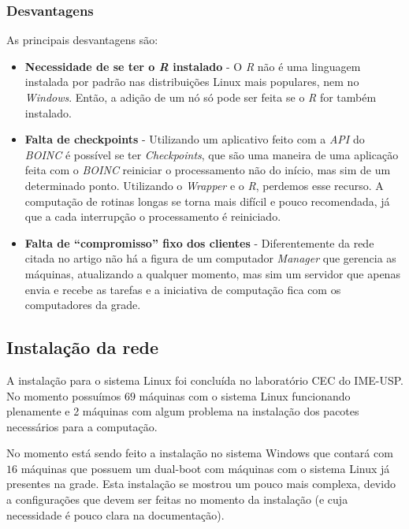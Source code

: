 \subsubsection{Desvantagens}

As principais desvantagens são:

\begin{itemize}
  \item \textbf{Necessidade de se ter o \emph{R} instalado} - O \emph{R} não é uma linguagem ins\-ta\-la\-da por padrão
nas distribuições Linux mais populares, nem no \emph{Windows}. Então, a adição de um nó só pode ser feita se o \emph{R}
for também instalado. 
  \item \textbf{Falta de checkpoints} - Utilizando um aplicativo feito com a \emph{API} do \emph{BOINC} é possível se ter
\emph{Checkpoints}, que são uma maneira de uma aplicação feita com o \emph{BOINC} reiniciar o processamento
não do início, mas sim de um determinado ponto. Utilizando o \emph{Wrapper} e o \emph{R}, perdemos esse recurso. A computação
de rotinas longas se torna mais difícil e pouco recomendada, já que a cada interrupção o processamento é reiniciado. 
  \item \textbf{Falta de ``compromisso'' fixo dos clientes} - Diferentemente da rede citada no artigo \cite{Dias}
não há a figura de um computador \emph{Manager} que gerencia as máquinas, atualizando a qualquer momento, mas sim um servidor 
que apenas envia e recebe as tarefas e a iniciativa de computação fica com os computadores da grade. 

\end{itemize}

\subsection{Instalação da rede}

A instalação para o sistema Linux foi concluída no laboratório CEC do IME-USP. No momento possuímos $69$ máquinas com o sistema 
Linux funcionando plenamente e 2 máquinas com algum problema na instalação dos pacotes 
necessários para a computação.  

No momento está sendo feito a instalação no sistema Windows que contará com $16$ máquinas que possuem um dual-boot
com máquinas com o sistema Linux já presentes na grade. Esta instalação se mostrou um pouco mais complexa, de\-vi\-do a 
configurações que devem ser feitas no momento da instalação (e cuja necessidade é pouco clara na documentação).


